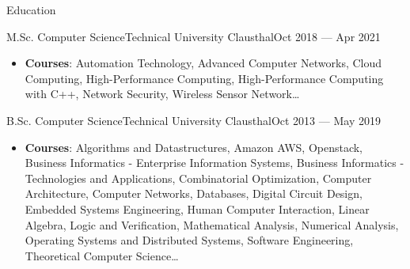 \documentclass[]{mcdowellcv}
\begin{document}
\begin{cvsection}{Education}
\begin{cvsubsection}{M.Sc. Computer Science}{Technical University Clausthal}{Oct 2018 --- Apr 2021}
\begin{itemize}
\item \textbf{Courses}: Automation Technology, Advanced Computer Networks, Cloud Computing, High-Performance Computing, High-Performance Computing with C++, Network Security, Wireless Sensor Network\ldots
\end{itemize}
\end{cvsubsection}
\begin{cvsubsection}{B.Sc. Computer Science}{Technical University Clausthal}{Oct 2013 --- May 2019}
\begin{itemize}
\item \textbf{Courses}: Algorithms and Datastructures, Amazon AWS, Openstack, Business Informatics - Enterprise Information Systems, Business Informatics - Technologies and Applications, Combinatorial Optimization, Computer Architecture, Computer Networks, Databases, Digital Circuit Design, Embedded Systems Engineering, Human Computer Interaction, Linear Algebra, Logic and Verification, Mathematical Analysis, Numerical Analysis, Operating Systems and Distributed Systems, Software Engineering, Theoretical Computer Science\ldots
\end{itemize}
\end{cvsubsection}

\end{cvsection}
\end{document}
